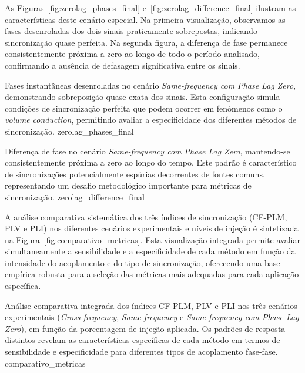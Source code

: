 As Figuras~\ref{fig:zerolag_phases_final} e~\ref{fig:zerolag_difference_final} ilustram as características deste cenário especial. Na primeira visualização, observamos as fases desenroladas dos dois sinais praticamente sobrepostas, indicando sincronização quase perfeita. Na segunda figura, a diferença de fase permanece consistentemente próxima a zero ao longo de todo o período analisado, confirmando a ausência de defasagem significativa entre os sinais.

{Fases instantâneas desenroladas no cenário \textit{Same-frequency com Phase Lag Zero}, demonstrando sobreposição quase exata dos sinais. Esta configuração simula condições de sincronização perfeita que podem ocorrer em fenômenos como o \textit{volume conduction}, permitindo avaliar a especificidade dos diferentes métodos de sincronização.}
{zerolag_phases_final}

{Diferença de fase no cenário \textit{Same-frequency com Phase Lag Zero}, mantendo-se consistentemente próxima a zero ao longo do tempo. Este padrão é característico de sincronizações potencialmente espúrias decorrentes de fontes comuns, representando um desafio metodológico importante para métricas de sincronização.}
{zerolag_difference_final}

A análise comparativa sistemática dos três índices de sincronização (CF-PLM, PLV e PLI) nos diferentes cenários experimentais e níveis de injeção é sintetizada na Figura~\ref{fig:comparativo_metricas}. Esta visualização integrada permite avaliar simultaneamente a sensibilidade e a especificidade de cada método em função da intensidade do acoplamento e do tipo de sincronização, oferecendo uma base empírica robusta para a seleção das métricas mais adequadas para cada aplicação específica.

{Análise comparativa integrada dos índices CF-PLM, PLV e PLI nos três cenários experimentais (\textit{Cross-frequency}, \textit{Same-frequency} e \textit{Same-frequency com Phase Lag Zero}), em função da porcentagem de injeção aplicada. Os padrões de resposta distintos revelam as características específicas de cada método em termos de sensibilidade e especificidade para diferentes tipos de acoplamento fase-fase.}
{comparativo_metricas}

